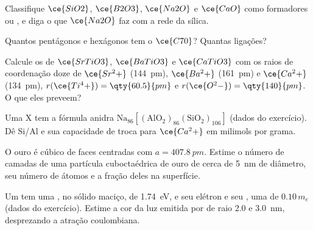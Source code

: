 \begin{exercise}[$\star$]\label{exo:b3:inorganic-materials:3}
Classifique $\ce{SiO2}$, $\ce{B2O3}$, $\ce{Na2O}$ e $\ce{CaO}$ como formadores ou , e diga o que
$\ce{Na2O}$ faz com a rede da sílica.
\end{exercise}

\begin{exercise}[$\star$]\label{exo:b3:inorganic-materials:4}
Quantos pentágonos e hexágonos tem o $\ce{C70}$? Quantas ligações?
\end{exercise}

\begin{exercise}[$\star\star$]\label{exo:b3:inorganic-materials:5}
Calcule os  de $\ce{SrTiO3}$, $\ce{BaTiO3}$ e $\ce{CaTiO3}$ com os raios de coordenação doze
de $\ce{Sr^2+}$ (\qty{144}{pm}), $\ce{Ba^2+}$ (\qty{161}{pm}) e $\ce{Ca^2+}$ (\qty{134}{pm}), $r(\ce{Ti^4+}) = \qty{60.5}{pm}$ e $r(\ce{O^2-}) = \qty{140}{pm}$. O que
eles preveem?
\end{exercise}

\begin{exercise}[$\star\star$]\label{exo:b3:inorganic-materials:6}
Uma  X tem a fórmula anidra $\mathrm{Na_{86}[(AlO_2)_{86}(SiO_2)_{106}]}$ (dados do exercício).
Dê Si/Al e sua capacidade de troca para $\ce{Ca^2+}$ em milimols por grama.
\end{exercise}

\begin{exercise}[$\star\star$]\label{exo:b3:inorganic-materials:7}
O ouro é cúbico de faces centradas com $a = \qty{407.8}{pm}$. Estime o número de camadas de uma
partícula cuboctaédrica de ouro de cerca de \qty{5}{nm} de diâmetro, seu número de átomos e a
fração deles na superfície.
\end{exercise}

\begin{exercise}[$\star\star$]\label{exo:b3:inorganic-materials:8}
Um  tem uma , no sólido maciço, de \qty{1.74}{eV}, e seu elétron e seu , uma  de $0.10\,m_e$ (dados do exercício). Estime a cor da luz emitida por
 de raio 2.0 e \qty{3.0}{nm}, desprezando a atração coulombiana.
\end{exercise}

